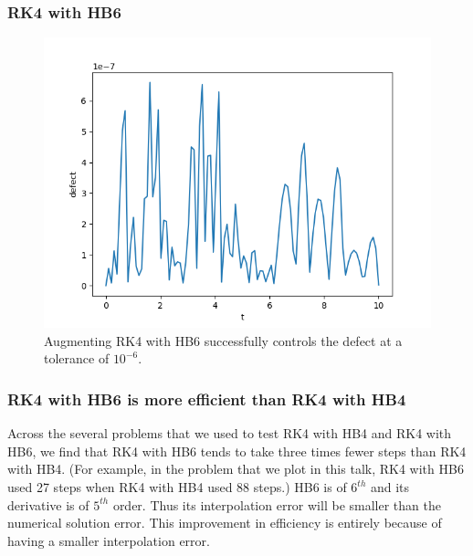 \documentclass{beamer}
\begin{document}
\begin{frame}
\frametitle{RK4 with HB6}
\begin{figure}[H]
    \centering
    \includegraphics[width=0.7\linewidth]{./figures/rk4_with_hb6_p1_global_defect}
    \caption{Augmenting RK4 with HB6 successfully controls the defect at a tolerance of $10^{-6}$.}
    \label{fig:rk4_with_hb6_p1_global_defect}
\end{figure}
\end{frame}

\begin{frame}
\frametitle{RK4 with HB6 is more efficient than RK4 with HB4}

Across the several problems that we used to test RK4 with HB4 and RK4 with HB6, we find that RK4 with HB6 tends to take three times fewer steps than RK4 with HB4. (For example, in the problem that we plot in this talk, RK4 with HB6 used 27 steps when RK4 with HB4 used 88 steps.)
\newline \newline
HB6 is of $6^{th}$ and its derivative is of $5^{th}$ order. Thus its interpolation error will be smaller than the numerical solution error.
\newline \newline
This improvement in efficiency is entirely because of having a smaller interpolation error.
\end{frame}
\end{document}
